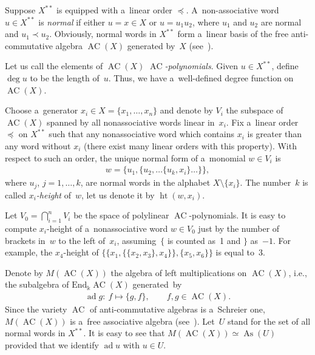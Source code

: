 \documentclass[11pt]{article}
\DeclareMathOperator{\ad}{ad}
\begin{document}
Suppose $X^{**}$ is equipped with a~linear order $\preceq $.
A~non-associative word $u\in X^{**}$ is {\em normal} if either $u=x\in X$ or $u=u_1u_2$, where $u_1$ and $u_2$ are
normal and $u_1\prec u_2$.
Obviously, normal words in $X^{**}$ form a~linear basis of the free anti-commutative algebra $\operatorname{AC}(X)$ generated by~$X$
(see~\cite{BokutCL, ShirshovE}).

Let us call the elements of $\operatorname{AC}(X)$ {\em $\operatorname{AC}$-polynomials}.
Given $u\in X^{**}$, def\/ine $\deg u$ to be the length of~$u$.
Thus, we have a~well-def\/ined degree function on $\operatorname{AC}(X)$.

Choose a~generator $x_i\in X=\{x_1,\dots, x_n\}$ and denote by $V_i$ the subspace of $\operatorname{AC}(X)$ spanned by all
nonassociative words linear in~$x_i$.
Fix a~linear order $\preceq $ on $X^{**}$ such that any nonassociative word which contains $x_i$ is greater than any
word without $x_i$ (there exist many linear orders with this property).
With respect to such an order, the unique normal form of a~monomial $w\in V_i$ is
\begin{gather}
\label{eq:Normal-i-Form}
w = \{u_1, \{u_2, \dots \{u_k, x_i\}\dots\}\},
\end{gather}
where $u_j$, $j=1,\dots, k$, are normal words in the alphabet $X\setminus \{x_i\}$.
The number~$k$ is called {\em $x_i$-height} \cite{FarkasI} of~$w$, let us denote it by $\operatorname{ht}(w, x_i)$.

Let $V_0 = \bigcap\limits_{i=1}^n V_i$ be the space of polylinear $\operatorname{AC}$-polynomials.
It is easy to compute $x_i$-height of a~nonassociative word $w\in V_0$ just by the number of brackets in~$w$ to the left
of~$x_i$, assuming~$\{$ is counted as~1 and $\}$ as~$-1$.
For example, the $x_4$-height of $\{\{x_1, \{\{x_2, x_3\},x_4\} \},\{x_5,x_6\}\}$ is equal to~3.

Denote by $M(\operatorname{AC}(X))$ the algebra of left multiplications on $\operatorname{AC}(X)$, i.e., the subalgebra of $\mathrm{End}_\Bbbk
\operatorname{AC}(X)$ generated~by
\begin{gather*}
\ad g:  \ f\mapsto \{g,f\},
\qquad
f,g\in \operatorname{AC}(X).
\end{gather*}
Since the variety $\operatorname{AC}$ of anti-commutative algebras is a~Schreier one, $M(\operatorname{AC}(X))$ is a~free associative algebra
(see~\cite{Umirbaev1994}).
Let~$U$ stand for the set of all normal words in $X^{**}$.
It is easy to see that $M(\operatorname{AC}(X)) \simeq  \operatorname{As}(U)$ provided that we identify $\ad u$ with $u\in U$.
\end{document}
